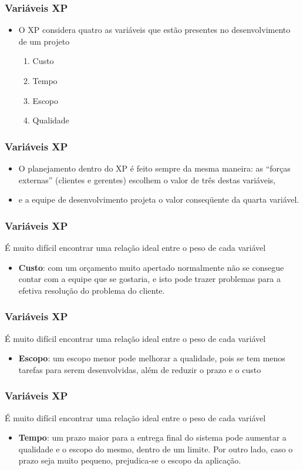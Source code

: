 \begin{frame}
 \frametitle{Variáveis XP}
 \begin{itemize}
  \item O XP considera quatro as variáveis que estão presentes no desenvolvimento de um projeto
  \begin{enumerate}
   \item Custo
   \item Tempo
   \item Escopo
     \item Qualidade
  \end{enumerate}
 \end{itemize}
\end{frame}

\begin{frame}
 \frametitle{Variáveis XP}
 \begin{itemize}
  \item O planejamento dentro do XP é feito sempre da mesma maneira: as “forças externas” (clientes e gerentes) escolhem o valor de três destas variáveis,
  \item e a equipe de desenvolvimento projeta o valor conseqüente da quarta variável.
 \end{itemize}
\end{frame}

\begin{frame}
 \frametitle{Variáveis XP}
 É muito difícil encontrar uma relação ideal entre o peso de cada variável
 \begin{itemize}
  \item \textbf{Custo}: com um orçamento muito apertado normalmente não se consegue contar com a equipe que se gostaria, e isto pode trazer problemas para a efetiva resolução do problema do cliente.
 \end{itemize}
\end{frame}

\begin{frame}
 \frametitle{Variáveis XP}
 É muito difícil encontrar uma relação ideal entre o peso de cada variável
 \begin{itemize}
  \item \textbf{Escopo}:  um escopo menor pode melhorar a qualidade, pois se tem menos tarefas para serem desenvolvidas, além de reduzir o prazo e o custo
 \end{itemize}
\end{frame}

\begin{frame}
 \frametitle{Variáveis XP}
 É muito difícil encontrar uma relação ideal entre o peso de cada variável
 \begin{itemize}
  \item \textbf{Tempo}:  um prazo maior para a entrega final do sistema pode aumentar a qualidade e o escopo do mesmo, dentro de um limite. Por outro lado, caso o prazo seja muito pequeno, prejudica-se o escopo da aplicação.
 \end{itemize}
\end{frame}

